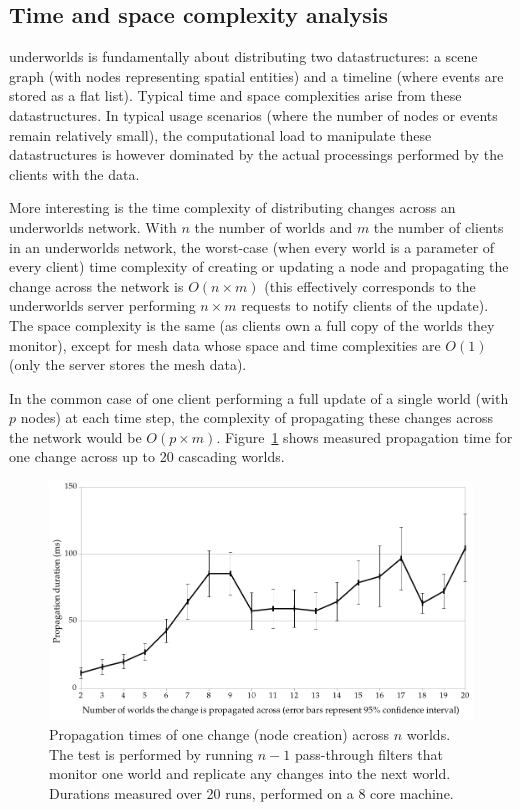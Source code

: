 \documentclass[letterpaper, 10pt, conference]{ieeeconf}
\newcommand{\uwds}{{\sc underworlds}\xspace}
\begin{document}
\subsection{Time and space complexity analysis}

\uwds is fundamentally about distributing two datastructures: a scene graph
(with nodes representing spatial entities) and a timeline (where events are
stored as a flat list). Typical time and space complexities arise from these
datastructures. In typical usage scenarios (where the number of nodes or events
remain relatively small), the computational load to manipulate these
datastructures is however dominated by the actual processings performed by the
clients with the data.

More interesting is the time complexity of distributing changes across an \uwds
network. With $n$ the number of worlds and $m$ the number of clients in an \uwds
network, the worst-case (when every world is a parameter of every
client) time complexity of creating or updating a node and propagating the
change across the network is $O(n \times m)$ (this effectively corresponds to
the \uwds server performing $n \times m$ requests to notify clients of the
update).  The space complexity is the same (as clients own a full copy of the
worlds they monitor), except for mesh data whose space and time complexities are
$O(1)$ (only the server stores the mesh data).

In the common case of one client performing a full update of a single world
(with $p$ nodes) at each time step, the complexity of propagating these changes across
the network would be $O(p \times m)$. Figure~\ref{fig|performances} shows
measured propagation time for one change across up to 20 cascading worlds.

\begin{figure}
    \centering
    \includegraphics[width=\linewidth]{performances}
    \caption{Propagation times of one change (node creation)
    across $n$ worlds. The test is performed by running $n-1$ pass-through
    filters that monitor one world and replicate
    any changes into the next world. Durations measured over 20 runs, performed on
    a 8 core machine.}
    \label{fig|performances}
\end{figure}
\end{document}
